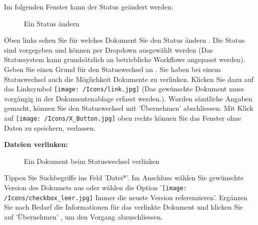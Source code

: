 Im folgenden Fenster kann der Status geändert werden:

\begin{figure}[H]
\caption{Ein Status ändern}
\end{figure}

Oben links sehen Sie für welches Dokument Sie den Status ändern . Die Status sind vorgegeben und können per Dropdown ausgewählt werden  (Das Statussystem kann grundsätzlich an betriebliche Workflows angepasst werden). Geben Sie einen Grund für den Statuswechsel an . Sie haben bei einem Statuswechsel auch die Möglichkeit Dokumente zu verlinken. Klicken Sie dazu auf das Linksymbol \texttt{[image: /Icons/link.jpg]}  (Das gewünschte Dokument muss vorgängig in der Dokumentenablage erfasst werden.). Wurden sämtliche Angaben gemacht, können Sie den Statuswechsel mit 'Übernehmen'  abschliessen. Mit Klick auf \texttt{[image: /Icons/X\_Button.jpg]}  oben rechts können Sie das Fenster ohne Daten zu speichern, verlassen.

\vspace{\baselineskip}

\textbf{Dateien verlinken:}

\begin{figure}[H]
\caption{Ein Dokument beim Statuswechsel verlinken}
\end{figure}

Tippen Sie Suchbegriffe ins Feld 'Datei*'. Im Anschluss wählen Sie gewünschte Version des Dokumets aus oder wählen die Option '\texttt{[image: /Icons/checkbox\_leer.jpg]} Immer die neuste Version referenzieren'. Ergänzen Sie nach Bedarf die Informationen für das verlinkte Dokument und klicken Sie auf 'Übernehmen' , um den Vorgang abzuschliessen.

